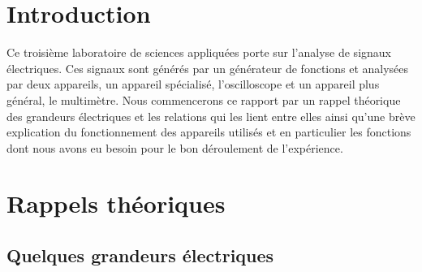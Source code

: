\documentclass[a4paper]{article}
\begin{document}
\let\cleardoublepage\clearpage















\section{Introduction}





Ce troisième laboratoire de sciences appliquées porte sur l'analyse de signaux électriques. Ces signaux sont générés par un générateur de fonctions et analysées par deux appareils, un appareil spécialisé, l'oscilloscope et un appareil plus général, le multimètre. Nous commencerons ce rapport par un rappel théorique des grandeurs électriques et les relations qui les lient entre elles ainsi qu'une brève explication du fonctionnement des appareils utilisés et en particulier les fonctions dont nous avons eu besoin pour le bon déroulement de l'expérience.















\section{Rappels théoriques}










\subsection{Quelques grandeurs électriques}
\end{document}
